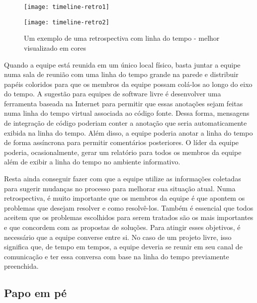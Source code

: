 

\begin{figure}[htb]
  \begin{minipage}[t]{0.5\linewidth}
    \centering
    \texttt{[image: timeline-retro1]}
  \end{minipage}
  \begin{minipage}[t]{0.5\linewidth}
    \centering
    \texttt{[image: timeline-retro2]}
  \end{minipage}
  \caption{Um exemplo de uma retrospectiva com linha do tempo - melhor
  visualizado em cores}
  \label{fig:timelineretro}
\end{figure}

Quando a equipe está reunida em um único local físico, basta juntar a
equipe numa sala de reunião com uma linha do tempo grande na parede e
distribuir papéis coloridos para que os membros da equipe possam
colá-los ao longo do eixo do tempo. A sugestão para equipes de
software livre é desenvolver uma ferramenta baseada na Internet para
permitir que essas anotações sejam feitas numa linha do tempo virtual
associada ao código fonte. Dessa forma, mensagens de integração de
código poderiam conter a anotação que seria automaticamente exibida na
linha do tempo. Além disso, a equipe poderia anotar a linha do tempo
de forma assíncrona para permitir comentários posteriores. O líder da
equipe poderia, ocasionalmente, gerar um relatório para todos os
membros da equipe além de exibir a linha do tempo no ambiente
informativo.

Resta ainda conseguir fazer com que a equipe utilize as informações
coletadas para sugerir mudanças no processo para melhorar sua situação
atual. Numa retrospectiva, é muito importante que os membros da equipe
é que apontem os problemas que desejam resolver e como
resolvê-los. Também é essencial que todos aceitem que os problemas
escolhidos para serem tratados são os mais importantes e que concordem
com as propostas de soluções. Para atingir esses objetivos, é
necessário que a equipe converse entre si. No caso de um projeto
livre, isso significa que, de tempo em tempos, a equipe deveria se
reunir em seu canal de comunicação e ter essa conversa com base na
linha do tempo previamente preenchida.

\subsection{Papo em pé}
\label{subsec:stand-up}

